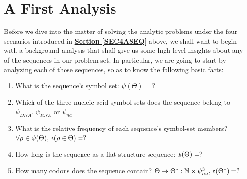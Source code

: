 \documentclass[a4paper, 18pt]{book} %
\newcommand{\invpi}{\rotatebox[origin=c]{180}{$\pi$}}
\begin{document}

\section{A First Analysis}
\label{SECFANAL}

Before we dive into the matter of solving the analytic problems under the four scenarios introduced in \textbf{\hyperref[SEC4ASEQ]{Section \ref{SEC4ASEQ}}} above, we shall want to begin with a background analysis that shall give us some high-level insights about any of the sequences in our problem set. In particular, we are going to start by analyzing each of those sequences, so as to know the following basic facts:

\begin{enumerate}
\item What is the sequence's symbol set: $\psi(\Theta) = ?$
\item Which of the three nucleic acid symbol sets does the sequence belong to --- $\psi_{DNA}$, $\psi_{RNA}$ or $\psi_{na}$
\item What is the relative frequency of each sequence's symbol-set members? $\forall \rho \in \psi(\Theta), \invpi(\rho \in \Theta) = ?$
\item How long is the sequence as a flat-structure sequence: $\invpi(\Theta) = ?$
\item How many codons does the sequence contain? $\Theta \rightarrow \Theta^*: \mathbb{N} \times \psi_{na}^3, \invpi(\Theta^*) = ?$
\end{enumerate}
\end{document}
